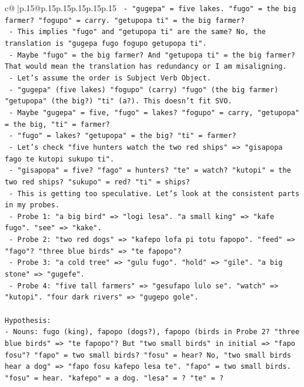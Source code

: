 \documentclass{article}
\begin{document}
{\begin{supertabular}{c@{$\;$}|p{.15\linewidth}@{}p{.15\linewidth}p{.15\linewidth}p{.15\linewidth}p{.15\linewidth}p{.15\linewidth}}
{{{\texttt{  {-} "gugepa" = five lakes. "fugo" = the big farmer? "fogupo" = carry. "getupopa ti" = the big farmer?} \\
\texttt{  {-} This implies "fugo" and "getupopa ti" are the same? No, the translation is "gugepa fugo fogupo getupopa ti".} \\
\texttt{  {-} Maybe "fugo" = the big farmer? And "getupopa ti" = the big farmer? That would mean the translation has redundancy or I am misaligning.} \\
\texttt{  {-} Let's assume the order is Subject Verb Object.} \\
\texttt{  {-} "gugepa" (five lakes) "fogupo" (carry) "fugo" (the big farmer) "getupopa" (the big?) "ti" (a?). This doesn't fit SVO.} \\
\texttt{  {-} Maybe "gugepa" = five, "fugo" = lakes? "fogupo" = carry, "getupopa" = the big, "ti" = farmer?} \\
\texttt{  {-} "fugo" = lakes? "getupopa" = the big? "ti" = farmer?} \\
\texttt{  {-} Let's check "five hunters watch the two red ships" => "gisapopa fago te kutopi sukupo ti".} \\
\texttt{  {-} "gisapopa" = five? "fago" = hunters? "te" = watch? "kutopi" = the two red ships? "sukupo" = red? "ti" = ships?} \\
\texttt{  {-} This is getting too speculative. Let's look at the consistent parts in my probes.} \\
\texttt{  {-} Probe 1: "a big bird" => "logi lesa". "a small king" => "kafe fugo". "see" => "kake".} \\
\texttt{  {-} Probe 2: "two red dogs" => "kafepo lofa pi totu fapopo". "feed" => "fago"? "three blue birds" => "te fapopo"?} \\
\texttt{  {-} Probe 3: "a cold tree" => "gulu fugo". "hold" => "gile". "a big stone" => "gugefe".} \\
\texttt{  {-} Probe 4: "five tall farmers" => "gesufapo lulo se". "watch" => "kutopi". "four dark rivers" => "gugepo gole".} \\
\\ 
\texttt{Hypothesis:} \\
\texttt{{-} Nouns: fugo (king), fapopo (dogs?), fapopo (birds in Probe 2? "three blue birds" => "te fapopo"? But "two small birds" in initial => "fapo fosu"? "fapo" = two small birds? "fosu" = hear? No, "two small birds hear a dog" => "fapo fosu kafepo lesa te". "fapo" = two small birds. "fosu" = hear. "kafepo" = a dog. "lesa" = ? "te" = ?} \\
}}}
\end{supertabular}}
\end{document}
